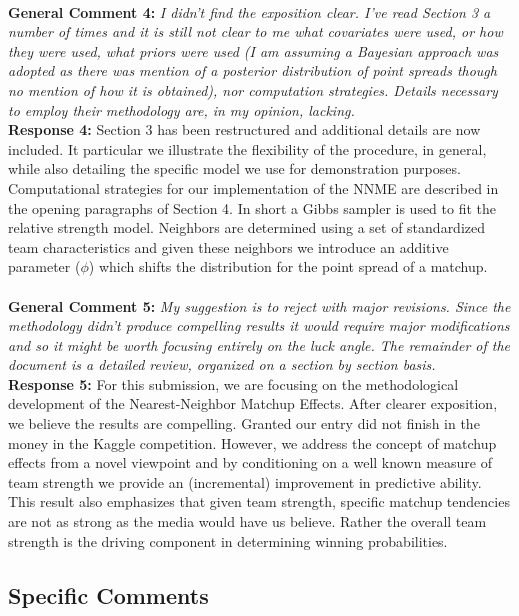 \documentclass[11pt]{article} %
\begin{document}
\\
{\bf General Comment 4:} \emph{I didn't find the exposition clear. I've read Section 3 a number of times and it is still not clear to me what covariates were used, or how they were used, what priors were used (I am assuming a Bayesian approach was adopted as there was mention of a posterior distribution of point spreads though no mention of how it is obtained), nor computation strategies. Details necessary to employ their methodology are, in my opinion, lacking.}\\
{\bf Response 4:} Section 3 has been restructured and additional details are now included. It particular we illustrate the flexibility of the procedure, in general, while also detailing the specific model we use for demonstration purposes. Computational strategies for our implementation of the NNME are described in the opening paragraphs of Section 4. In short a Gibbs sampler is used to fit the relative strength model. Neighbors are determined using a set of standardized team characteristics and given these neighbors we introduce an additive parameter ($\phi$) which shifts the distribution for the point spread of a matchup.\\
\\
{\bf General Comment 5:} \emph{My suggestion is to reject with major revisions. Since the methodology didn't produce compelling results it would require major modifications and so it might be worth focusing entirely on the luck angle. The remainder of the document is a detailed review, organized on a section by section basis.}\\
{\bf Response 5:} For this submission, we are focusing on the methodological development of the Nearest-Neighbor Matchup Effects. After clearer exposition, we believe the results are compelling. Granted our entry did not finish in the money in the Kaggle competition. However, we address the concept of matchup effects from a novel viewpoint and by conditioning on a well known measure of team strength we provide an (incremental) improvement in predictive ability. This result also emphasizes that given team strength, specific matchup tendencies are not as strong as the media would have us believe. Rather the overall team strength is the driving component in determining winning probabilities.\\ 
\subsection*{Specific Comments}
\end{document}
